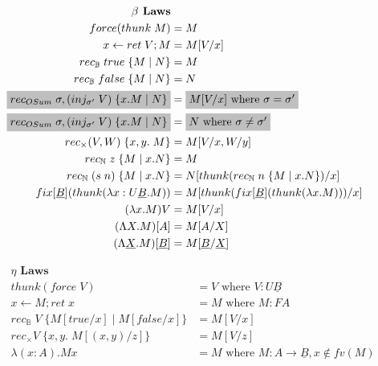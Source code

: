 \documentclass[acmsmall]{acmart}
\begin{document}
\begin{figure}[H]
  \centering
  \scriptsize
  \begin{minipage}[t]{0.48\textwidth}
    \[
    \begin{aligned}
      \textbf{$\beta$ Laws}& \\
      force (thunk \; M) &= M\\
      x \leftarrow ret \; V; M &= M[V/x]\\
      rec_{\mathbb{B}} \; true \; \{M \;|\; N\} &= M \\
      rec_{\mathbb{B}} \; false \; \{M \;|\; N\} &= N \\
      \colorbox{lightgray}{$rec_{OSum}\; \sigma,(inj_{\sigma'}\;V)\;\{x.M \;|\; N\}$} &= \colorbox{lightgray}{$M[V/x] \text{ where } \sigma = \sigma'$}\\
      \colorbox{lightgray}{$rec_{OSum}\; \sigma,(inj_{\sigma'}\;V)\;\{x.M \;|\; N\}$} &= \colorbox{lightgray}{$N \text{ where } \sigma \neq \sigma'$}\\
      rec_\times (V,W)\;\{x,y.\;M\} &= M[V/x,W/y]\\
      rec_{\mathbb{N}} \; z \; \{M \;|\;x. N\} &= M \\
      rec_{\mathbb{N}} \; (s\;n) \; \{M \;|\;x. N\} &= N[thunk(rec_{\mathbb{N}} \; n \; \{M \;|\;x. N\})/x] \\
      fix[\underline{B}](thunk(\lambda x : U\underline{B}. M)) &= M[thunk(fix[\underline{B}](thunk(\lambda x. M)))/x]\\
      (\lambda x.M)V &= M[V/x]\\
      (\Lambda X.M)[A] &= M[A/X] \\
      (\Lambda \underline{X}.M)[\underline{B}] &= M[\underline{B}/\underline{X}]
    \end{aligned}
    \]
  \end{minipage}\hfill
  \begin{minipage}[t]{0.48\textwidth}
    \[
    \begin{aligned}
      \textbf{$\eta$ Laws}& \\
      thunk(force \;V) &= V  \text{ where } V : U\underline{B}\\
      x \leftarrow M; ret \; x &= M  \text{ where } M : FA \\
      rec_{\mathbb{B}} \; V \; \{M[true/x] \;|\; M[false/x]\} &= M[V/x]\\
      rec_\times V\;\{x,y.\;M[(x,y)/z]\} &= M[V/z] \\
      \lambda (x :A) . Mx &= M  \text{ where } M : A \rightarrow \underline{B}, x \notin fv(M)\\

\end{aligned}\]
\end{minipage}
\end{figure}
\end{document}
